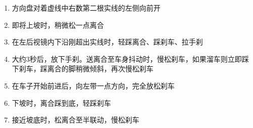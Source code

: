 \begin{enumerate}
    \item 方向盘对着虚线中右数第二根实线的左侧向前开
    \item 即将上坡时，稍微松一点离合
    \item 在左后视镜内下沿刚超出实线时，轻踩离合、踩刹车、拉手刹
    \item 大约3秒后，放下手刹。送离合至车身抖动时，慢松刹车，如果溜车则立即踩下刹车，踩离合的脚稍微倾斜，再次慢松刹车
    \item 在车子开始前进后，向左带一点方向，完全放松刹车
    \item 下坡时，离合踩到底，轻踩刹车
    \item 接近坡底时，松离合至半联动，慢松刹车
\end{enumerate}